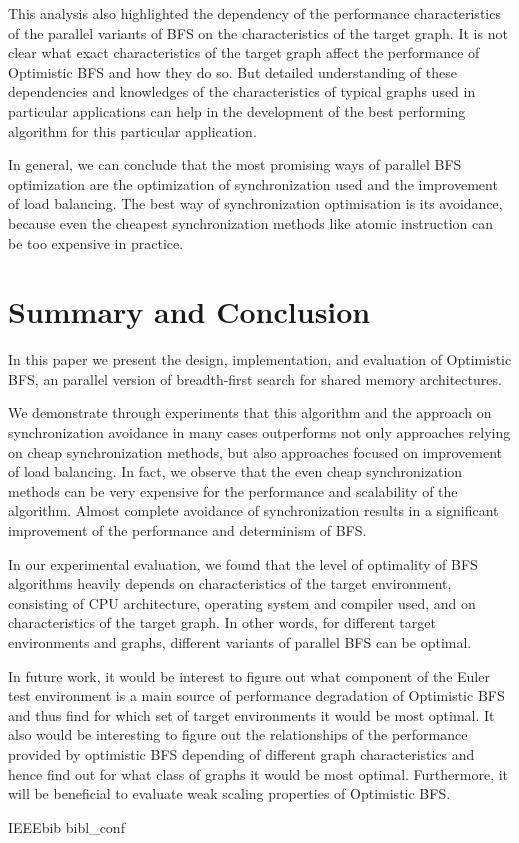 \documentclass[letterpaper]{article}
\begin{document}
		This analysis also highlighted the dependency of the performance characteristics of the parallel variants of BFS on the characteristics of the target graph.
		It is not clear what exact characteristics of the target graph affect the performance of Optimistic BFS and how they do so. 
		But detailed understanding of these dependencies and knowledges of the characteristics of typical graphs used in particular applications can help in the development of the best performing algorithm for this particular application.
		
		In general, we can conclude that the most promising ways of parallel BFS optimization are the optimization of synchronization used and the improvement of load balancing. 
		The best way of synchronization optimisation is its avoidance, because even the cheapest synchronization methods like atomic instruction can be too expensive in practice.
		
	\section{Summary and Conclusion}\label{sec:suco} %
		In this paper we present the design, implementation, and evaluation of Optimistic BFS, an parallel version of breadth-first search for shared memory architectures.
		
		We demonstrate through experiments that this algorithm and the approach on synchronization avoidance in many cases outperforms not only approaches relying on cheap synchronization methods, but also approaches focused on improvement of load balancing. 		
		In fact, we observe that the even cheap synchronization methods can be very expensive for the performance and scalability of the algorithm.  
		Almost complete avoidance of synchronization results in a significant improvement of the performance and determinism of BFS. 
		
		In our experimental evaluation, we found that the level of optimality of BFS algorithms heavily depends on characteristics of the target environment, consisting of CPU architecture, operating system and compiler used, and on characteristics of the target graph. 
		In other words, for different target environments and graphs, different variants of parallel BFS can be optimal. 
		
		In future work, it would be interest to figure out what component of the Euler test environment is a main source of performance degradation of Optimistic BFS and thus find for which set of target environments it would be most optimal.  		
		It also would be interesting to figure out the relationships of the performance provided by optimistic BFS depending of different graph characteristics and hence find out for what class of graphs it would be most optimal.
		Furthermore, it will be beneficial to evaluate weak scaling properties of Optimistic BFS.
	
	 	{IEEEbib} %
	 		{bibl_conf}
\end{document}
